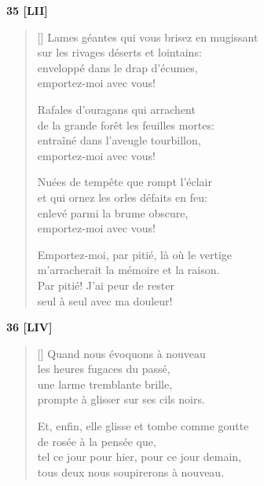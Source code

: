\documentclass[a4paper,12pt]{book}
\begin{document}
\bigskip

\begin{center}
  \textbf{35 [LII]}
\end{center}

\settowidth{\versewidth}{Lames géantes qui vous brisez en mugissant}

\begin{verse}[\versewidth]
  Lames géantes qui vous brisez en mugissant \\
  sur les rivages déserts et lointains: \\
  enveloppé dans le drap d'écumes, \\
  emportez-moi avec vous!

  Rafales d'ouragans qui arrachent \\
  de la grande forêt les feuilles mortes: \\
  entraîné dans l'aveugle tourbillon, \\
  emportez-moi avec vous!

  Nuées de tempête que rompt l'éclair \\
  et qui ornez les orles défaits en feu: \\
  enlevé parmi la brume obscure, \\
  emportez-moi avec vous!

  Emportez-moi, par pitié, là où le vertige \\
  m'arracherait la mémoire et la raison. \\
  Par pitié! J'ai peur de rester \\
  seul à seul avec ma douleur!
\end{verse}

\bigskip

\begin{center}
  \textbf{36 [LIV]}
\end{center}

\settowidth{\versewidth}{et, à nouveau, leurs fleurs s'ouvriront le soir,}

\begin{verse}[\versewidth]
  Quand nous évoquons à nouveau \\
  les heures fugaces du passé, \\
  une larme tremblante brille, \\
  prompte à glisser sur ses cils noirs.

  Et, enfin, elle glisse et tombe comme goutte \\
  de rosée à la pensée que, \\
  tel ce jour pour hier, pour ce jour demain, \\
  tous deux nous soupirerons à nouveau.
\end{verse}
\end{document}
